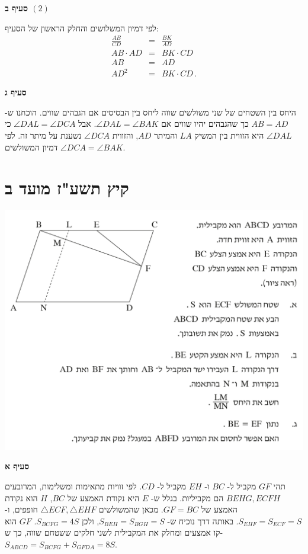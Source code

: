 \documentclass[12pt,a4paper]{article}
\begin{document}
\textbf{סעיף ב %
$(2)$}

לפי דמיון המשלושים והחלק הראשון של הסעיף:
\begin{eqnarray*}
\frac{AB}{CD}&=&\frac{BK}{AD}\\
AB\cdot AD &=& BK\cdot CD\\
AB&=&AD\\
AD^2 &=& BK\cdot CD\,.
\end{eqnarray*}
\vspace{-10mm}

\textbf{סעיף ג}

היחס בין השטחים של שני משולשים שווה ליחס בין הבסיסים אם הגבהים שווים. הוכחנו ש-%
$AB=AD$
כך שהגבהים יהיו שווים אם
$\angle DAL = \angle BAK$.
אבל 
$\angle DAL=\angle DCA$
כי 
$\angle DAL$
היא הזווית בין המשיק
$LA$
והמיתר 
$AD$,
והזווית
$\angle DCA$
נשענת על מיתר זה. לפי דמיון המשולשים
$\angle DCA=\angle BAK$.



\section*{קיץ תשע"ז מועד ב}

\begin{center}
\includegraphics[width=\textwidth]{summer-2017b-4}
\end{center}
\vspace{-8mm}
\textbf{סעיף א}

תהי 
$GF$
מקביל ל-%
$BC$
ו-%
$EH$
מקביל ל-%
$CD$.
לפי זוויות מתאימות ומשלימות, המרובעים 
$BEHG,ECFH$
הם מקביליות. בגלל ש-%
$E$
היא נקודת האמצע של
$BC$,
$H$
הוא נקודת האמצע של
$GF=BC$.
מכאן שהמשולשים 
$\triangle ECF,\triangle EHF$
חופפים, ו-%
$S_{EHF}=S_{ECF}=S$.
באותה דרך נוכיח ש-%
$S_{BEH}=S_{BGH}=S$,
ולכן
$S_{BCFG}=4S$.
$GF$
הוא קו אמצעים ומחלק את המקבילית לשני חלקים ששטחם שווה, כך ש-%
$S_{ABCD}=S_{BCFG}+S_{GFDA}=8S$.
\end{document}
